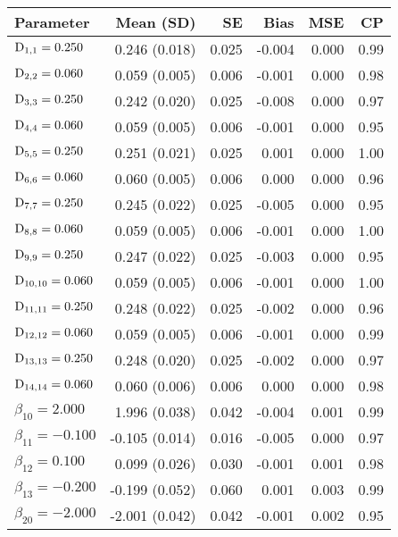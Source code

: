 \clearpage
\begin{table}[ht]
\centering
{}
\captionsetup{font=scriptsize}
\begingroup\tiny
\begin{tabular}{l|rrrrr}
  Parameter & Mean (SD) & SE & Bias & MSE & CP \\ 
  \hline
  $\mathrm{D}_{1,1} = 0.250$ &  0.246 (0.018) & 0.025 & -0.004 & 0.000 & 0.99 \\ 
  $\mathrm{D}_{2,2} = 0.060$ &  0.059 (0.005) & 0.006 & -0.001 & 0.000 & 0.98 \\ 
  $\mathrm{D}_{3,3} = 0.250$ &  0.242 (0.020) & 0.025 & -0.008 & 0.000 & 0.97 \\ 
  $\mathrm{D}_{4,4} = 0.060$ &  0.059 (0.005) & 0.006 & -0.001 & 0.000 & 0.95 \\ 
  $\mathrm{D}_{5,5} = 0.250$ &  0.251 (0.021) & 0.025 &  0.001 & 0.000 & 1.00 \\ 
  $\mathrm{D}_{6,6} = 0.060$ &  0.060 (0.005) & 0.006 &  0.000 & 0.000 & 0.96 \\ 
  $\mathrm{D}_{7,7} = 0.250$ &  0.245 (0.022) & 0.025 & -0.005 & 0.000 & 0.95 \\ 
  $\mathrm{D}_{8,8} = 0.060$ &  0.059 (0.005) & 0.006 & -0.001 & 0.000 & 1.00 \\ 
  $\mathrm{D}_{9,9} = 0.250$ &  0.247 (0.022) & 0.025 & -0.003 & 0.000 & 0.95 \\ 
  $\mathrm{D}_{10,10} = 0.060$ &  0.059 (0.005) & 0.006 & -0.001 & 0.000 & 1.00 \\ 
  $\mathrm{D}_{11,11} = 0.250$ &  0.248 (0.022) & 0.025 & -0.002 & 0.000 & 0.96 \\ 
  $\mathrm{D}_{12,12} = 0.060$ &  0.059 (0.005) & 0.006 & -0.001 & 0.000 & 0.99 \\ 
  $\mathrm{D}_{13,13} = 0.250$ &  0.248 (0.020) & 0.025 & -0.002 & 0.000 & 0.97 \\ 
  $\mathrm{D}_{14,14} = 0.060$ &  0.060 (0.006) & 0.006 &  0.000 & 0.000 & 0.98 \\ 
  $\beta_{10} = 2.000$ &  1.996 (0.038) & 0.042 & -0.004 & 0.001 & 0.99 \\ 
  $\beta_{11} = -0.100$ & -0.105 (0.014) & 0.016 & -0.005 & 0.000 & 0.97 \\ 
  $\beta_{12} = 0.100$ &  0.099 (0.026) & 0.030 & -0.001 & 0.001 & 0.98 \\ 
  $\beta_{13} = -0.200$ & -0.199 (0.052) & 0.060 &  0.001 & 0.003 & 0.99 \\ 
  $\beta_{20} = -2.000$ & -2.001 (0.042) & 0.042 & -0.001 & 0.002 & 0.95 \\ 

\end{tabular}
\end{table}
